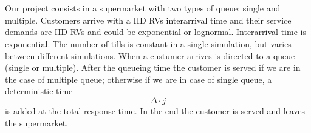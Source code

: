 \section*{}
\paragraph{} Our project consists in a supermarket with two types of queue: single and multiple. Customers arrive with a IID RVs interarrival time and their service demands are IID RVs and could be exponential or lognormal. Interarrival time is exponential. The number of tills is constant in a single simulation, but varies between different simulations. When a custumer arrives is directed to a queue (single or multiple). After the queueing time the customer is served if we are in the case of multiple queue; otherwise if we are in case of single queue, a deterministic time \[\Delta \cdot j\] is added at the total response time. In the end the customer is served and leaves the supermarket. 
\clearpage